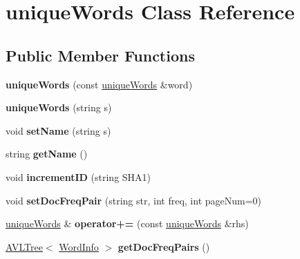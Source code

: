\hypertarget{classunique_words}{\section{unique\+Words Class Reference}
\label{classunique_words}
}
\subsection*{Public Member Functions}
\begin{DoxyCompactItemize}
\item 
\hypertarget{classunique_words_a1124f70d6b94a791a5c53f1188c75c2c}{{\bfseries unique\+Words} (const \hyperlink{classunique_words}{unique\+Words} \&word)}\label{classunique_words_a1124f70d6b94a791a5c53f1188c75c2c}

\item 
\hypertarget{classunique_words_a964ba0558cded02ecf8c1f33ebb4bc9c}{{\bfseries unique\+Words} (string s)}\label{classunique_words_a964ba0558cded02ecf8c1f33ebb4bc9c}

\item 
\hypertarget{classunique_words_ae67a24b7a951cb687eda75cb4f630fca}{void {\bfseries set\+Name} (string s)}\label{classunique_words_ae67a24b7a951cb687eda75cb4f630fca}

\item 
\hypertarget{classunique_words_a7098dbeeca0a8963f873020b79789f71}{string {\bfseries get\+Name} ()}\label{classunique_words_a7098dbeeca0a8963f873020b79789f71}

\item 
\hypertarget{classunique_words_ad23a8595adf31b4ffcc8149efa510630}{void {\bfseries increment\+I\+D} (string S\+H\+A1)}\label{classunique_words_ad23a8595adf31b4ffcc8149efa510630}

\item 
\hypertarget{classunique_words_a3fc6e0c178048c2870ec34e07a783827}{void {\bfseries set\+Doc\+Freq\+Pair} (string str, int freq, int page\+Num=0)}\label{classunique_words_a3fc6e0c178048c2870ec34e07a783827}

\item 
\hypertarget{classunique_words_aade17e58ba6e3be3e8da501e9822e095}{\hyperlink{classunique_words}{unique\+Words} \& {\bfseries operator+=} (const \hyperlink{classunique_words}{unique\+Words} \&rhs)}\label{classunique_words_aade17e58ba6e3be3e8da501e9822e095}

\item 
\hypertarget{classunique_words_a7829d2c85feec32c833251b4b9931913}{\hyperlink{class_a_v_l_tree}{A\+V\+L\+Tree}$<$ \hyperlink{class_word_info}{Word\+Info} $>$ {\bfseries get\+Doc\+Freq\+Pairs} ()}\label{classunique_words_a7829d2c85feec32c833251b4b9931913}

\end{DoxyCompactItemize}

